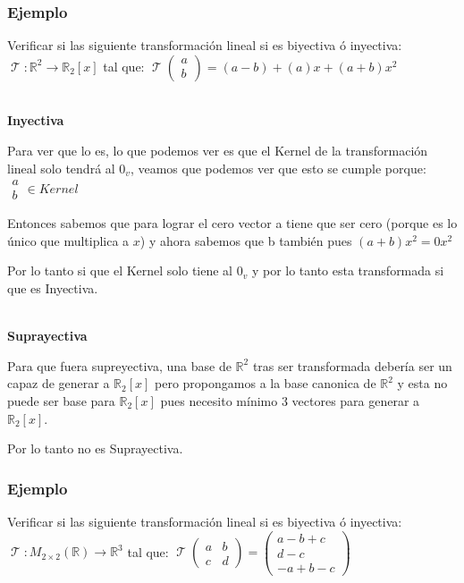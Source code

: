 \documentclass[12pt]{report}                                %
\DeclareMathOperator \LinealTransformation {\mathcal{T}}
\begin{document}
            \clearpage
            \subsubsection{Ejemplo}
            Verificar si las siguiente transformación lineal si es biyectiva ó inyectiva:
            $\LinealTransformation : \mathbb{R}^2 \to \mathbb{R}_2[x]$ tal que: 
            $\LinealTransformation(\begin{matrix}a\\b\end{matrix}) = (a-b) + (a)x + (a+b)x^2$

            \textbf{\\Inyectiva}

            Para ver que lo es, lo que podemos ver es que el Kernel de la transformación lineal
            solo tendrá al $0_v$, veamos que podemos ver que esto se cumple porque:
            $\begin{matrix}a\\b\end{matrix} \in Kernel$

            Entonces sabemos que para lograr el cero vector a tiene que ser cero (porque es lo 
            único que multiplica a $x$) y ahora sabemos que b también pues $(a+b)x^2=0x^2$

            Por lo tanto si que el Kernel solo tiene al $0_v$ y por lo tanto esta transformada si que es Inyectiva.


            \textbf{\\Suprayectiva}

            Para que fuera supreyectiva, una base de $\mathbb{R}^2$ tras ser transformada debería ser un capaz de
            generar a $\mathbb{R}_2[x]$ pero propongamos a la base canonica de  $ \mathbb{R}^2$ y esta no puede
            ser base para $\mathbb{R}_2[x]$ pues necesito mínimo 3 vectores para generar a $\mathbb{R}_2[x]$.

            Por lo tanto no es Suprayectiva.


            \clearpage
            \subsubsection{Ejemplo}
            Verificar si las siguiente transformación lineal si es biyectiva ó inyectiva:
            $\LinealTransformation : M_{2 \times 2}(\mathbb{R}) \to \mathbb{R}^3$ tal que: 
            $\LinealTransformation(\begin{matrix}a&b\\c&d\end{matrix}) = \begin{pmatrix}a-b+c\\d-c\\-a+b-c\end{pmatrix}$
\end{document}
